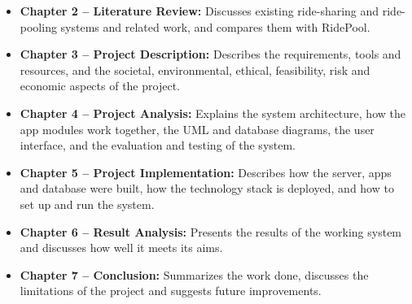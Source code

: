 \begin{itemize}
  \item \textbf{Chapter 2 -- Literature Review:} Discusses existing
        ride-sharing and ride-pooling systems and related work, and compares
        them with RidePool.
  \item \textbf{Chapter 3 -- Project Description:} Describes the requirements,
        tools and resources, and the societal, environmental, ethical,
        feasibility, risk and economic aspects of the project.
  \item \textbf{Chapter 4 -- Project Analysis:} Explains the system
        architecture, how the app modules work together, the UML and database
        diagrams, the user interface, and the evaluation and testing of the
        system.
  \item \textbf{Chapter 5 -- Project Implementation:} Describes how the
        server, apps and database were built, how the technology stack is
        deployed, and how to set up and run the system.
  \item \textbf{Chapter 6 -- Result Analysis:} Presents the results of the
        working system and discusses how well it meets its aims.
  \item \textbf{Chapter 7 -- Conclusion:} Summarizes the work done, discusses
        the limitations of the project and suggests future improvements.
\end{itemize}
